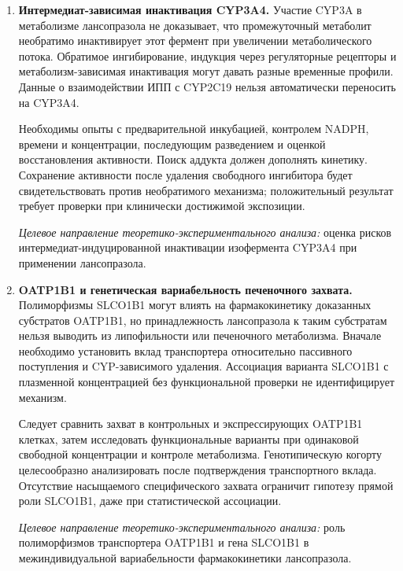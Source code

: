 \documentclass[11pt,a4paper,notitlepage]{report}
\newcommand{\src}[1]{\unskip\space\cite{#1}}
\begin{document}
\begin{enumerate}[label=\textbf{\arabic*.},start=21,leftmargin=*,itemsep=0.9\baselineskip]
\textit{Целевое направление теоретико-экспериментального анализа:} цитокин-индуцированная феноконверсия метаболизма лансопразола у критически больных пациентов.

\item \textbf{Интермедиат-зависимая инактивация CYP3A4.} Участие CYP3A в метаболизме лансопразола не доказывает, что промежуточный метаболит необратимо инактивирует этот фермент при увеличении метаболического потока. Обратимое ингибирование, индукция через регуляторные рецепторы и метаболизм-зависимая инактивация могут давать разные временные профили. Данные о взаимодействии ИПП с CYP2C19 нельзя автоматически переносить на CYP3A4.\src{molp450,molcypinhib,molpxr,cardioogilvie2011}

Необходимы опыты с предварительной инкубацией, контролем NADPH, времени и концентрации, последующим разведением и оценкой восстановления активности. Поиск аддукта должен дополнять кинетику. Сохранение активности после удаления свободного ингибитора будет свидетельствовать против необратимого механизма; положительный результат требует проверки при клинически достижимой экспозиции.

\textit{Целевое направление теоретико-экспериментального анализа:} оценка рисков интермедиат-индуцированной инактивации изофермента CYP3A4 при применении лансопразола.

\item \textbf{OATP1B1 и генетическая вариабельность печеночного захвата.} Полиморфизмы SLCO1B1 могут влиять на фармакокинетику доказанных субстратов OATP1B1, но принадлежность лансопразола к таким субстратам нельзя выводить из липофильности или печеночного метаболизма. Вначале необходимо установить вклад транспортера относительно пассивного поступления и CYP-зависимого удаления. Ассоциация варианта SLCO1B1 с плазменной концентрацией без функциональной проверки не идентифицирует механизм.\src{pharmalabel,molp450,cpic}

Следует сравнить захват в контрольных и экспрессирующих OATP1B1 клетках, затем исследовать функциональные варианты при одинаковой свободной концентрации и контроле метаболизма. Генотипическую когорту целесообразно анализировать после подтверждения транспортного вклада. Отсутствие насыщаемого специфического захвата ограничит гипотезу прямой роли SLCO1B1, даже при статистической ассоциации.

\textit{Целевое направление теоретико-экспериментального анализа:} роль полиморфизмов транспортера OATP1B1 и гена SLCO1B1 в межиндивидуальной вариабельности фармакокинетики лансопразола.

\end{enumerate}
\end{document}
